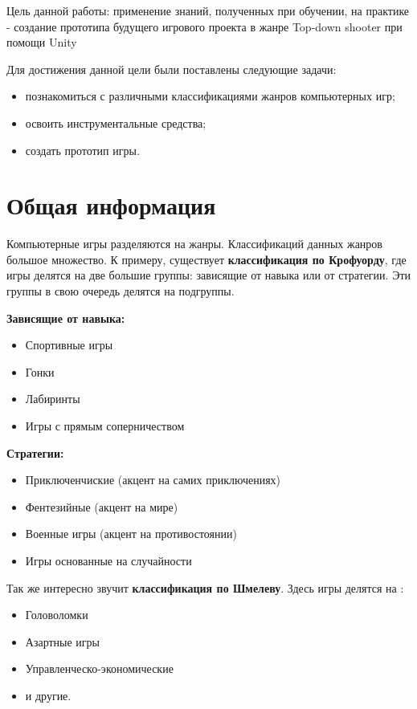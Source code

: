 \documentclass[14pt, titlepage,fleqn,a4paper]{extarticle}
\begin{document}
Цель данной работы: применение знаний, полученных при обучении, на практике - создание прототипа будущего игрового проекта в жанре Top-down shooter при помощи Unity

Для достижения данной цели были поставлены следующие задачи:
\begin{itemize}
\item познакомиться с различными классификациями жанров компьютерных игр; 
\item освоить инструментальные средства;
\item создать прототип игры.
\end{itemize}
    \section*{Общая информация}
	
	Компьютерные игры разделяются на жанры. Классификаций данных жанров большое множество.
К примеру, существует \textbf{классификация по Крофуорду}, где игры делятся на две большие группы: зависящие от навыка или от стратегии.
Эти группы в свою очередь  делятся на подгруппы.

	 \textbf{Зависящие от навыка:}
	\begin{itemize}
		\item Спортивные игры
		\item Гонки
		\item Лабиринты
		\item Игры с прямым соперничеством
	\end{itemize}

	\textbf{Стратегии:}
	\begin{itemize}
		\item Приключенчиские (акцент на самих приключениях)
		\item Фентезийные (акцент на мире)
		\item Военные игры (акцент на противостоянии)
		\item Игры основанные на случайности
	\end{itemize}

Так же интересно звучит \textbf{классификация по Шмелеву}.
Здесь игры делятся на :
\begin{itemize}
	\item Головоломки
	\item Азартные игры
	\item Управленческо-экономические
	\item и другие.
\end{itemize}
\end{document}
